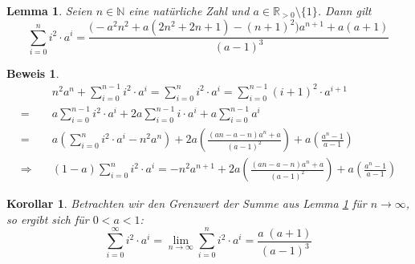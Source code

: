 \documentclass[a4paper]{article}
\newtheorem{korollar}[satz]{Korollar}
\newtheorem{lemma}[satz]{Lemma}
\theoremstyle{nonumberplain}
\newtheorem{beweis}{Beweis}
\begin{document}
\begin{lemma} \label{lem-infqsum}
	Seien $n \in \mathbb{N}$ eine natürliche Zahl und $a \in \mathbb{R}_{>0}\setminus\{1\}$. Dann gilt
	\begin{equation}
	\sum_{i=0}^{n}{i^2\cdot a^i} = \frac{\big(-a^2n^2 + a(2n^2 + 2n + 1) - (n+1)^2\big)a^{n+1}+a(a+1)}{(a-1)^3}
	\end{equation}
\end{lemma}
\begin{beweis}
	\begin{align*}
		 & n^2a^n + \sum_{i=0}^{n-1}{i^2\cdot a^i} = \sum_{i=0}^{n}{i^2\cdot a^i} = \sum_{i=0}^{n-1}{(i+1)^2\cdot a^{i+1}} \\
		=& a \sum_{i=0}^{n-1}{i^2\cdot a^{i}} + 2a \sum_{i=0}^{n-1}{i\cdot a^{i}} + a \sum_{i=0}^{n-1}{ a^{i}} \\
		=& a \left(\sum_{i=0}^{n}{i^2\cdot a^i} - n^2a^n \right) + 2a \left(\frac{(an-a-n)a^{n}+a}{(a-1)^2} \right) + a \left( \frac{a^{n}-1}{a-1} \right) \\
		\Rightarrow \quad & (1-a) \sum_{i=0}^{n}{i^2\cdot a^i} = -n^2a^{n+1} + 2a \left(\frac{(an-a-n)a^{n}+a}{(a-1)^2} \right) + a \left( \frac{a^{n}-1}{a-1} \right)
	\end{align*}
\end{beweis}
\begin{korollar} \label{kor-infqsum}
Betrachten wir den Grenzwert der Summe aus Lemma \ref{lem-infqsum} für $n \to \infty$, so ergibt sich für $0<a<1$:
\begin{equation}
\sum_{i=0}^{\infty}{i^2\cdot a^i}
= \lim\limits_{n \to \infty} \sum_{i=0}^{n}{i^2\cdot a^i}
= \frac{a\;(a+1)}{(a-1)^3}
\end{equation}	
\end{korollar}

\printbibliography
\end{document}
